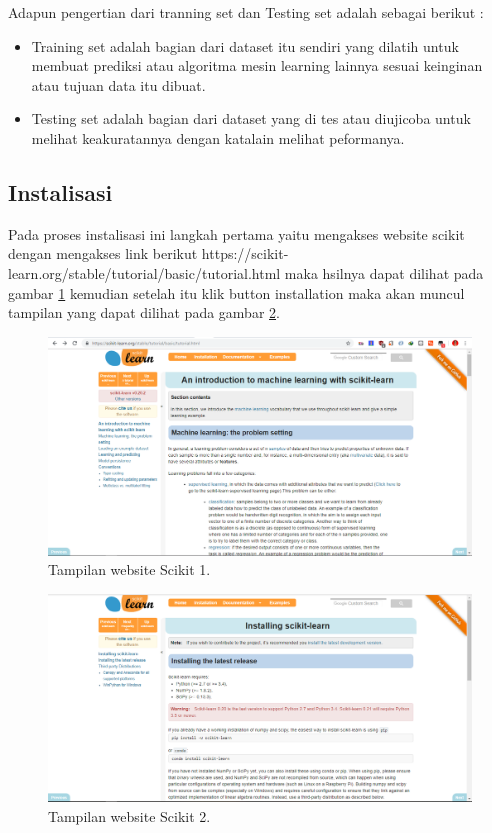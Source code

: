 \begin{enumerate}
Adapun pengertian dari tranning set dan Testing set adalah sebagai berikut :
\begin{itemize}
\item
Training set adalah bagian dari dataset itu sendiri yang dilatih untuk membuat prediksi atau algoritma mesin learning lainnya sesuai keinginan atau tujuan data itu dibuat.
\item
Testing set adalah bagian dari dataset yang di tes atau diujicoba untuk melihat keakuratannya dengan katalain melihat peformanya.
\end{itemize}
\end{enumerate}

\subsection{Instalisasi}\par
Pada proses instalisasi ini langkah pertama yaitu mengakses website scikit dengan mengakses link berikut  https://scikit-learn.org/stable/tutorial/basic/tutorial.html maka hsilnya dapat dilihat pada gambar \ref{sc} kemudian setelah itu klik button installation maka akan muncul tampilan yang dapat dilihat pada gambar \ref{sc1}.
\begin{figure}[ht]
      \centerline{\includegraphics[width=1\textwidth]
      {figures/sc}}
      \caption{Tampilan website Scikit 1.}
      \label{sc}
      \end{figure}
\begin{figure}[ht]
      \centerline{\includegraphics[width=1\textwidth]
      {figures/sc1}}
      \caption{Tampilan website Scikit 2.}
      \label{sc1}
      \end{figure}
